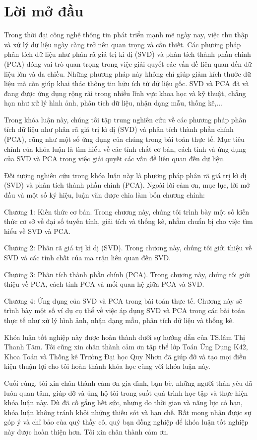 \documentclass[12pt,a4paper,oneside]{report}
\numberwithin{equation}{section}
\begin{document}
\chapter*{Lời mở đầu}

\begin{justify}   
Trong thời đại công nghệ thông tin phát triển mạnh mẽ ngày nay, việc thu thập và xử lý dữ liệu ngày càng trở nên quan trọng và cần thiết. Các phương pháp phân tích dữ liệu như phân rã giá trị kì dị (SVD) và phân tích thành phần chính (PCA) đóng vai trò quan trọng trong việc giải quyết các vấn đề liên quan đến dữ liệu lớn và đa chiều. Những phương pháp này không chỉ giúp giảm kích thước dữ liệu mà còn giúp khai thác thông tin hữu ích từ dữ liệu gốc. SVD và PCA đã và đang được ứng dụng rộng rãi trong nhiều lĩnh vực khoa học và kỹ thuật, chẳng hạn như xử lý hình ảnh, phân tích dữ liệu, nhận dạng mẫu, thống kê,...

Trong khóa luận này, chúng tôi tập trung nghiên cứu về các phương pháp phân tích dữ liệu như phân rã giá trị kì dị (SVD) và phân tích thành phần chính (PCA), cũng như một số ứng dụng của chúng trong bài toán thực tế. Mục tiêu chính của khóa luận là tìm hiểu về các tính chất cơ bản, cách tính và ứng dụng của SVD và PCA trong việc giải quyết các vấn đề liên quan đến dữ liệu.

Đối tượng nghiên cứu trong khóa luận này là phương pháp phân rã giá trị kì dị (SVD) và phân tích thành phần chính (PCA). Ngoài lời cảm ơn, mục lục, lời mở đầu và một số ký hiệu, luận văn được chia làm bốn chương chính:

Chương 1: Kiến thức cơ bản. Trong chương này, chúng tôi trình bày một số kiến thức cơ sở về đại số tuyến tính, giải tích và thống kê, nhằm chuẩn bị cho việc tìm hiểu về SVD và PCA.

Chương 2: Phân rã giá trị kì dị (SVD). Trong chương này, chúng tôi giới thiệu về SVD và các tính chất của ma trận liên quan đến SVD.

Chương 3: Phân tích thành phần chính (PCA). Trong chương này, chúng tôi giới thiệu về PCA, cách tính PCA và mối quan hệ giữa PCA và SVD.

Chương 4: Ứng dụng của SVD và PCA trong bài toán thực tế. Chương này sẽ trình bày một số ví dụ cụ thể về việc áp dụng SVD và PCA trong các bài toán thực tế như xử lý hình ảnh, nhận dạng mẫu, phân tích dữ liệu và thống kê.

Khóa luận tốt nghiệp này được hoàn thành dưới sự hướng dẫn của TS.lâm Thị Thanh Tâm. Tôi cũng xin chân thành cảm ơn tập thể lớp Toán Ứng Dụng K42, Khoa Toán và Thống kê Trường Đại học Quy Nhơn đã giúp đỡ và tạo mọi điều kiện thuận lợi cho tôi hoàn thành khóa học cùng với khóa luận này.

Cuối cùng, tôi xin chân thành cảm ơn gia đình, bạn bè, những người thân yêu đã luôn quan tâm, giúp đỡ và ủng hộ tôi trong suốt quá trình học tập và thực hiện khóa luận này. Dù đã cố gắng hết sức, nhưng do thời gian và năng lực có hạn, khóa luận không tránh khỏi những thiếu sót và hạn chế. Rất mong nhận được sự góp ý và chỉ bảo của quý thầy cô, quý bạn đồng nghiệp để khóa luận tốt nghiệp này được hoàn thiện hơn. Tôi xin chân thành cảm ơn.
\end{justify}
\end{document}
